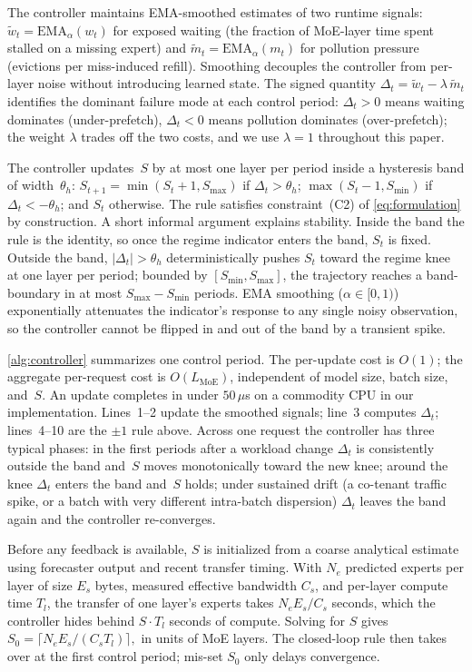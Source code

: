 The controller maintains EMA-smoothed estimates of two runtime
signals: $\tilde{w}_t = \mathrm{EMA}_\alpha(w_t)$ for exposed waiting
(the fraction of MoE-layer time spent stalled on a missing expert)
and $\tilde{m}_t = \mathrm{EMA}_\alpha(m_t)$ for pollution pressure
(evictions per miss-induced refill). Smoothing decouples the
controller from per-layer noise without introducing learned state.
The signed quantity $\Delta_t = \tilde{w}_t - \lambda\,\tilde{m}_t$
identifies the dominant failure mode at each control period:
$\Delta_t > 0$ means waiting dominates (under-prefetch), $\Delta_t < 0$
means pollution dominates (over-prefetch); the weight $\lambda$ trades
off the two costs, and we use $\lambda = 1$ throughout this paper.

The controller updates~$S$ by at most one layer per period inside a
hysteresis band of width~$\theta_h$:
$S_{t+1} = \min(S_t{+}1, S_{\max})$ if $\Delta_t > \theta_h$;
$\max(S_t{-}1, S_{\min})$ if $\Delta_t < -\theta_h$; and $S_t$
otherwise. The rule satisfies constraint~(C2) of
\autoref{eq:formulation} by construction. A short informal argument
explains stability. Inside the band the rule is the identity, so once
the regime indicator enters the band, $S_t$ is fixed. Outside the
band, $|\Delta_t|>\theta_h$ deterministically pushes $S_t$ toward the
regime knee at one layer per period; bounded by
$[S_{\min}, S_{\max}]$, the trajectory reaches a band-boundary in at
most $S_{\max}-S_{\min}$ periods. EMA smoothing ($\alpha\in[0,1)$)
exponentially attenuates the indicator's response to any single noisy
observation, so the controller cannot be flipped in and out of the
band by a transient spike.

\autoref{alg:controller} summarizes one control period. The per-update
cost is $O(1)$; the aggregate per-request cost is
$O(L_{\text{MoE}})$, independent of model size, batch size, and~$S$.
An update completes in under $50\,\mu$s on a commodity CPU in our
implementation. Lines~1--2 update the smoothed signals; line~3
computes $\Delta_t$; lines~4--10 are the $\pm 1$ rule above. Across
one request the controller has three typical phases: in the first
periods after a workload change $\Delta_t$ is consistently outside
the band and~$S$ moves monotonically toward the new knee; around the
knee $\Delta_t$ enters the band and~$S$ holds; under sustained drift
(a co-tenant traffic spike, or a batch with very different
intra-batch dispersion) $\Delta_t$ leaves the band again and the
controller re-converges.

Before any feedback is available, $S$ is initialized from a coarse
analytical estimate using forecaster output and recent transfer
timing. With $N_e$ predicted experts per layer of size $E_s$ bytes,
measured effective bandwidth $C_s$, and per-layer compute time $T_l$,
the transfer of one layer's experts takes $N_e E_s / C_s$ seconds,
which the controller hides behind $S\cdot T_l$ seconds of compute.
Solving for $S$ gives
\(
S_0 = \lceil N_e E_s / (C_s T_l) \rceil,
\)
in units of MoE layers. The closed-loop rule then takes over at the
first control period; mis-set $S_0$ only delays convergence.

